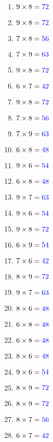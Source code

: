 \documentclass[11pt]{article}\usepackage[a4paper,margin=0.90in,tmargin=0.5in]{geometry}\usepackage{amsmath, amsthm, amssymb}
\begin{document}
\vspace{0.5\baselineskip}\begin{multicols*}{4}
\begin{enumerate}[itemsep=2.3\baselineskip]
\item $9 \times 8 = { \color[rgb]{0,0,1} 72 }$ 
\item $9 \times 8 = { \color[rgb]{0,0,1} 72 }$ 
\item $7 \times 8 = { \color[rgb]{0,0,1} 56 }$ 
\item $7 \times 9 = { \color[rgb]{0,0,1} 63 }$ 
\item $9 \times 8 = { \color[rgb]{0,0,1} 72 }$ 
\item $6 \times 7 = { \color[rgb]{0,0,1} 42 }$ 
\item $9 \times 8 = { \color[rgb]{0,0,1} 72 }$ 
\item $7 \times 8 = { \color[rgb]{0,0,1} 56 }$ 
\item $7 \times 9 = { \color[rgb]{0,0,1} 63 }$ 
\item $6 \times 8 = { \color[rgb]{0,0,1} 48 }$ 
\item $9 \times 6 = { \color[rgb]{0,0,1} 54 }$ 
\item $6 \times 8 = { \color[rgb]{0,0,1} 48 }$ 
\item $9 \times 7 = { \color[rgb]{0,0,1} 63 }$ 
\item $9 \times 6 = { \color[rgb]{0,0,1} 54 }$ 
\item $9 \times 8 = { \color[rgb]{0,0,1} 72 }$ 
\item $6 \times 9 = { \color[rgb]{0,0,1} 54 }$ 
\item $7 \times 6 = { \color[rgb]{0,0,1} 42 }$ 
\item $8 \times 9 = { \color[rgb]{0,0,1} 72 }$ 
\item $9 \times 7 = { \color[rgb]{0,0,1} 63 }$ 
\item $8 \times 6 = { \color[rgb]{0,0,1} 48 }$ 
\item $6 \times 8 = { \color[rgb]{0,0,1} 48 }$ 
\item $6 \times 8 = { \color[rgb]{0,0,1} 48 }$ 
\item $8 \times 6 = { \color[rgb]{0,0,1} 48 }$ 
\item $9 \times 6 = { \color[rgb]{0,0,1} 54 }$ 
\item $8 \times 9 = { \color[rgb]{0,0,1} 72 }$ 
\item $8 \times 9 = { \color[rgb]{0,0,1} 72 }$ 
\item $8 \times 7 = { \color[rgb]{0,0,1} 56 }$ 
\item $6 \times 7 = { \color[rgb]{0,0,1} 42 }$ 

\end{enumerate}
\end{multicols*}
\end{document}
